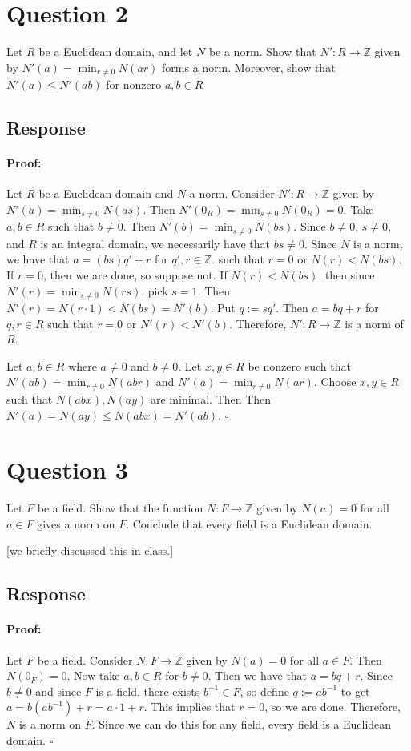 \documentclass [12pt] {article}
\newcommand{\Z}{\mathbb{Z}}
\newenvironment{proof}{\paragraph{Proof:}}{\hfill$\square$}
\begin{document}
\section*{Question 2}
Let $R$ be a Euclidean domain, and let $N$ be a norm. Show that $N':R\to\Z$ given by
$N'(a) = \min_{r\neq 0} N(ar)$ forms a norm. Moreover, show that $N'(a)\leq N'(ab)$ for nonzero
$a,b\in R$
\subsection*{Response}
\begin{proof}
    Let $R$ be a Euclidean domain and $N$ a norm. Consider $N' : R \to \Z$ given by
    $N'(a) = \min_{s \neq 0} N(as)$. Then $N'(0_R) = \min_{s \neq 0} N(0_R) = 0$. Take $a, b \in R$
    such that $b \neq 0$. Then $N'(b) = \min_{s \neq 0} N(bs)$. Since $b \neq 0$, $s \neq 0$, and
    $R$ is an integral domain, we necessarily have that $bs \neq 0$. Since $N$ is a norm, we have
    that $a = (bs)q' + r$ for $q', r \in \Z$. such that $r = 0$ or $N(r) < N(bs)$.
    If $r = 0$, then we are done, so suppose not. If $N(r) < N(bs)$, then
    since $N'(r) = \min_{s \neq 0}N(rs)$, pick $s = 1$. Then
    $N'(r) = N(r \cdot 1) < N(bs) = N'(b)$. Put $q := sq'$. Then $a = bq + r$ for
    $q, r \in R$ such that $r = 0$ or $N'(r) < N'(b)$. Therefore, $N' : R \to \Z$ is a norm
    of $R$.
    \vspace{1em}

    Let $a, b \in R$ where $a \neq 0$ and $b \neq 0$. Let $x, y \in R$ be nonzero such that
    $N'(ab) = \min_{r \neq 0}N(abr)$ and $N'(a) = \min_{r \neq 0}N(ar)$. Choose $x, y \in R$ such that
    $N(abx), N(ay)$ are minimal. Then Then $N'(a) = N(ay) \leq N(abx) = N'(ab)$.
\end{proof}
\newpage

\section*{Question 3}
Let $F$ be a field. Show that the function $N:F\to \Z$ given by $N(a)=0$ for all $a\in F$ gives a
norm on $F$. Conclude that every field is a Euclidean domain.

[we briefly discussed this in class.]
\subsection*{Response}
\begin{proof}
    Let $F$ be a field. Consider $N : F \to \Z$ given by $N(a) = 0$ for all $a \in F$. Then
    $N(0_F) = 0$. Now take $a, b \in R$ for $b \neq 0$. Then we have that $a = bq + r$. Since
    $b \neq 0$ and since $F$ is a field, there exists $b^{-1} \in F$, so define $q := ab^{-1}$ to
    get $a = b(ab^{-1}) + r = a \cdot 1 + r$. This implies that $r = 0$, so we are done. Therefore,
    $N$ is a norm on $F$. Since we can do this for any field, every field is a Euclidean domain.
\end{proof}
\newpage
\end{document}
